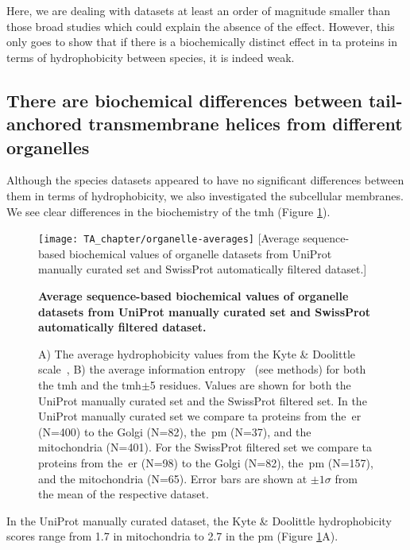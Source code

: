 Here, we are dealing with datasets at least an order of magnitude smaller than those broad studies \cite{Sharpe2010, Baker2017} which could explain the absence of the effect.
However, this only goes to show that if there is a biochemically distinct effect in \gls{ta} proteins in terms of hydrophobicity between species, it is indeed weak.


\subsection{There are biochemical differences between tail\--anchored transmembrane helices from different organelles}

Although the species datasets appeared to have no significant differences between them in terms of hydrophobicity, we also investigated the subcellular membranes.
We see clear differences in the biochemistry of the \gls{tmh} (Figure \ref{fig:average_organelle_factors_ta}).

\begin{figure}
\centering
\texttt{[image: TA\_chapter/organelle-averages]}
[Average sequence\--based biochemical values of organelle datasets from UniProt manually curated set and SwissProt automatically filtered dataset.]
{\textbf{Average sequence\--based biochemical values of organelle datasets from UniProt manually curated set and SwissProt automatically filtered dataset.}

A) The average hydrophobicity values from the Kyte \& Doolittle scale~\cite{Kyte1982}, B) the average information entropy~\cite{Shannon1948} (see methods) for both the \gls{tmh} and the \gls{tmh}$\pm$5 residues.
Values are shown for both the UniProt manually curated set and the SwissProt filtered set.
In the UniProt manually curated set we compare \gls{ta} proteins from the~\gls{er} (N=400) to the Golgi (N=82), the~\gls{pm} (N=37), and the mitochondria (N=401).
For the SwissProt filtered set we compare \gls{ta} proteins from the~\gls{er} (N=98) to the Golgi (N=82), the~\gls{pm} (N=157), and the mitochondria (N=65).
Error bars are shown at $\pm 1 \sigma$ from the mean of the respective dataset.
}

\label{fig:average_organelle_factors_ta}
\end{figure}


In the UniProt manually curated dataset, the Kyte \& Doolittle hydrophobicity scores range from 1.7 in mitochondria to 2.7 in the \gls{pm} (Figure \ref{fig:average_organelle_factors_ta}A).



